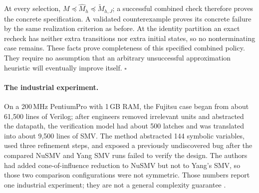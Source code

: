 At every selection,
\(M\preceq\widehat M_h\preceq\widetilde M_{h,J}\); a successful
combined check therefore proves the concrete specification. A validated
counterexample proves its concrete failure by the same realization
criterion as before. At the identity partition an exact recheck has
neither extra transitions nor extra initial states, so no nonterminating
case remains. These facts prove completeness of this specified combined
policy. They require no assumption that an arbitrary unsuccessful
approximation heuristic will eventually improve itself. \(\square\)

\paragraph{The industrial experiment.}
On a 200\,MHz
PentiumPro with 1\,GB RAM, the Fujitsu case began from about 61,500 lines of
Verilog; after engineers removed irrelevant units and abstracted the datapath,
the verification model had about 500 latches and was translated into about
9,500 lines of SMV.  The method abstracted 144 symbolic variables, used three
refinement steps, and exposed a previously undiscovered bug after the compared
NuSMV and Yang SMV runs failed to verify the design.  The authors had added
cone-of-influence reduction to NuSMV but not to Yang's SMV, so those two
comparison configurations were not symmetric.
Those numbers report one industrial experiment; they are not a general
complexity guarantee \cite[\S7.2]{ClarkeEtAl2003}.
